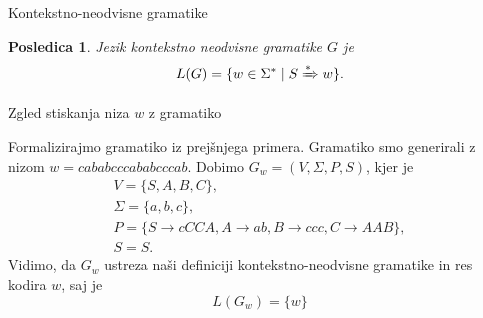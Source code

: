 \documentclass{beamer}
\theoremstyle{definition} %
\theoremstyle{plain} %
\newtheorem{posledica}[definicija]{Posledica}
\begin{document}
\begin{frame}{Kontekstno-neodvisne gramatike}
    
    \begin{posledica}
    
        Jezik kontekstno neodvisne gramatike $ G $ je
        \[
            L(G) = \{ w \in \Sigma^* \mid S \xRightarrow{*} w \}.
        \]
    
    \end{posledica}

\end{frame}

\begin{frame}{Zgled stiskanja niza $ w $ z gramatiko}
    
    Formalizirajmo gramatiko iz prejšnjega primera. Gramatiko smo generirali z nizom
    $ w = cababcccababcccab $.
    \pause
    Dobimo $ G_w = ( V, \Sigma, P, S ) $, kjer je 
    \begin{gather*}
        V = \{ S, A, B, C \}, \\
        \Sigma = \{ a, b, c \}, \\
        P = \{ S  \rightarrow  cCCA, A  \rightarrow  ab, B  
        \rightarrow  ccc, C  \rightarrow  AAB \}, \\
        S = S.
    \end{gather*}
    \pause
    Vidimo, da $ G_w $ ustreza naši definiciji kontekstno-neodvisne gramatike
    in res kodira $ w $, saj je 
    \[
        L(G_w) = \{w\}
    \]

\end{frame}
\end{document}
